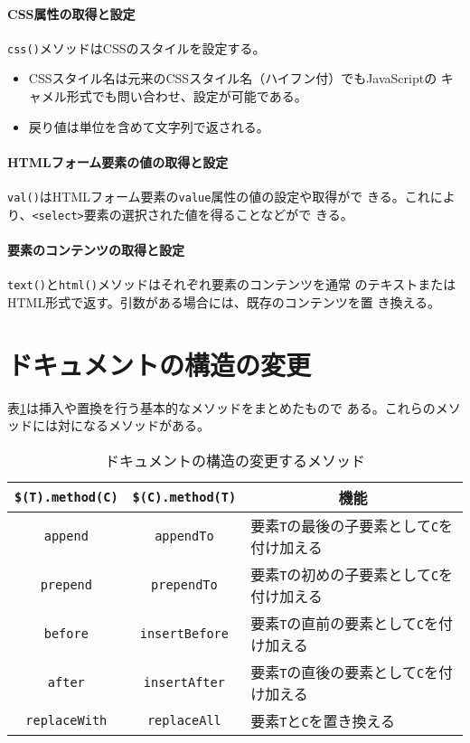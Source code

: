 \paragraph{CSS属性の取得と設定}
\texttt{css()}メソッドはCSSのスタイルを設定する。
\begin{itemize}
 \item CSSスタイル名は元来のCSSスタイル名（ハイフン付）でもJavaScriptの
       キャメル形式でも問い合わせ、設定が可能である。
 \item 戻り値は単位を含めて文字列で返される。
\end{itemize}
\paragraph{HTMLフォーム要素の値の取得と設定}
\texttt{val()}はHTMLフォーム要素の\texttt{value}属性の値の設定や取得がで
きる。これにより、\texttt{<select>}要素の選択された値を得ることなどがで
きる。
\paragraph{要素のコンテンツの取得と設定}
\texttt{text()}と\texttt{html()}メソッドはそれぞれ要素のコンテンツを通常
のテキストまたはHTML形式で返す。引数がある場合には、既存のコンテンツを置
き換える。
\section{ドキュメントの構造の変更}
表\ref{Insertreplace}は挿入や置換を行う基本的なメソッドをまとめたもので
ある。これらのメソッドには対になるメソッドがある。
\begin{table}[ht]
 \caption{ドキュメントの構造の変更するメソッド}\label{Insertreplace}
\begin{tabular}{|c|c|l|}
 \hline
 \texttt{\$(T).method(C)}&\texttt{\$(C).method(T)}&
    \multicolumn{1}{c|}{機能}\\\hline
 \texttt{append}&\texttt{appendTo}&
	 要素\texttt{T}の最後の子要素として\texttt{C}を付け加える\\ \hline
 \texttt{prepend}&\texttt{prependTo}&
	 要素\texttt{T}の初めの子要素として\texttt{C}を付け加える\\ \hline
 \texttt{before}&\texttt{insertBefore}&
	 要素\texttt{T}の直前の要素として\texttt{C}を付け加える\\ \hline
 \texttt{after}&\texttt{insertAfter}&
	 要素\texttt{T}の直後の要素として\texttt{C}を付け加える\\ \hline
 \texttt{replaceWith}&\texttt{replaceAll}&
	 要素\texttt{T}と\texttt{C}を置き換える\\ \hline
\end{tabular}\end{table}

